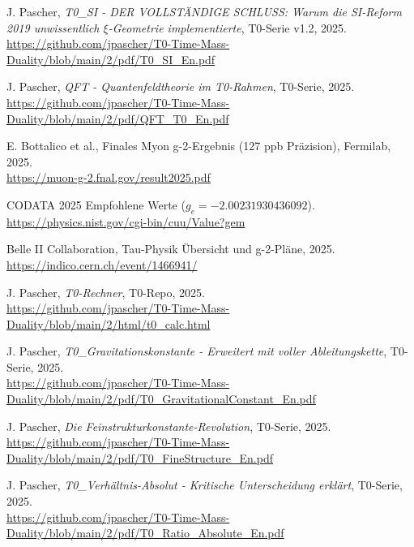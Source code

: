 \documentclass[12pt,a4paper]{article}
\begin{document}
	
	\begin{thebibliography}{99}
		 J. Pascher, \textit{T0\_SI - DER VOLLSTÄNDIGE SCHLUSS: Warum die SI-Reform 2019 unwissentlich $\xi$-Geometrie implementierte}, T0-Serie v1.2, 2025. \\
		\url{https://github.com/jpascher/T0-Time-Mass-Duality/blob/main/2/pdf/T0_SI_En.pdf}
		
		 J. Pascher, \textit{QFT - Quantenfeldtheorie im T0-Rahmen}, T0-Serie, 2025. \\
		\url{https://github.com/jpascher/T0-Time-Mass-Duality/blob/main/2/pdf/QFT_T0_En.pdf}
		
		 E. Bottalico et al., Finales Myon g-2-Ergebnis (127 ppb Präzision), Fermilab, 2025. \\
		\url{https://muon-g-2.fnal.gov/result2025.pdf}
		
		 CODATA 2025 Empfohlene Werte ($g_e = -2.00231930436092$). \\
		\url{https://physics.nist.gov/cgi-bin/cuu/Value?gem}
		
		 Belle II Collaboration, Tau-Physik Übersicht und g-2-Pläne, 2025. \\
		\url{https://indico.cern.ch/event/1466941/}
		
		 J. Pascher, \textit{T0-Rechner}, T0-Repo, 2025. \\
		\url{https://github.com/jpascher/T0-Time-Mass-Duality/blob/main/2/html/t0_calc.html}
		
		 J. Pascher, \textit{T0\_Gravitationskonstante - Erweitert mit voller Ableitungskette}, T0-Serie, 2025. \\
		\url{https://github.com/jpascher/T0-Time-Mass-Duality/blob/main/2/pdf/T0_GravitationalConstant_En.pdf}
		
		 J. Pascher, \textit{Die Feinstrukturkonstante-Revolution}, T0-Serie, 2025. \\
		\url{https://github.com/jpascher/T0-Time-Mass-Duality/blob/main/2/pdf/T0_FineStructure_En.pdf}
		
		 J. Pascher, \textit{T0\_Verhältnis-Absolut - Kritische Unterscheidung erklärt}, T0-Serie, 2025. \\
		\url{https://github.com/jpascher/T0-Time-Mass-Duality/blob/main/2/pdf/T0_Ratio_Absolute_En.pdf}
		

\end{thebibliography}
\end{document}
